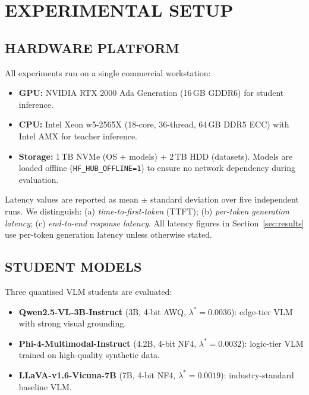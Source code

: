 \documentclass{ieeetmlcn}
\begin{document}
\section{EXPERIMENTAL SETUP}

\subsection{HARDWARE PLATFORM}
All experiments run on a single commercial workstation:
\begin{itemize}
  \item \textbf{GPU:} NVIDIA RTX 2000 Ada Generation (16\,GB GDDR6) for student inference.
  \item \textbf{CPU:} Intel Xeon w5-2565X (18-core, 36-thread, 64\,GB DDR5 ECC) with
        Intel AMX for teacher inference.
  \item \textbf{Storage:} 1\,TB NVMe (OS + models) + 2\,TB HDD (datasets). Models are loaded offline (\texttt{HF\_HUB\_OFFLINE=1}) to ensure no network dependency during evaluation.
\end{itemize}
Latency values are reported as mean $\pm$ standard deviation over five
independent runs. We distinguish: (a) \emph{time-to-first-token} (TTFT);
(b) \emph{per-token generation latency}; (c) \emph{end-to-end response
latency}. All latency figures in Section~\ref{sec:results} use per-token
generation latency unless otherwise stated.

\subsection{STUDENT MODELS}
Three quantised VLM students are evaluated:
\begin{itemize}
  \item \textbf{Qwen2.5-VL-3B-Instruct} \cite{qwen2025vl72b} (3B,
        4-bit AWQ, $\lambda^*=0.0036$): edge-tier VLM with strong visual
        grounding.
  \item \textbf{Phi-4-Multimodal-Instruct} \cite{abdin2024phi4technicalreport} (4.2B,
        4-bit NF4, $\lambda^*=0.0032$): logic-tier VLM trained on
        high-quality synthetic data.
  \item \textbf{LLaVA-v1.6-Vicuna-7B} \cite{liu2024llavanext} (7B, 4-bit NF4,
        $\lambda^*=0.0019$): industry-standard baseline VLM.
\end{itemize}
\end{document}
